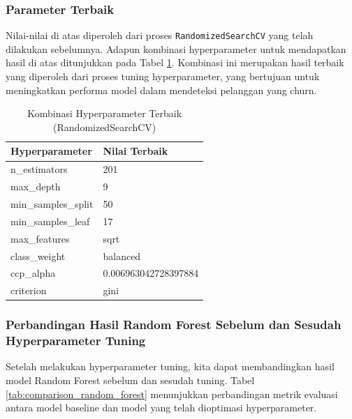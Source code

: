 \subsubsection{Parameter Terbaik}
Nilai-nilai di atas diperoleh dari proses \texttt{RandomizedSearchCV} yang telah dilakukan sebelumnya. Adapun kombinasi hyperparameter untuk mendapatkan hasil di atas ditunjukkan pada Tabel \ref{tab:best_params_random_forest}. Kombinasi ini merupakan hasil terbaik yang diperoleh dari proses tuning hyperparameter, yang bertujuan untuk meningkatkan performa model dalam mendeteksi pelanggan yang churn.


\begin{table}[H]
    \centering
    \caption{Kombinasi Hyperparameter Terbaik (RandomizedSearchCV)}
    \label{tab:best_params_random_forest}
    \begin{tabular}{|l|l|}
        \hline
        \textbf{Hyperparameter} & \textbf{Nilai Terbaik} \\ \hline
        n\_estimators & 201 \\ \hline
        max\_depth & 9 \\ \hline
        min\_samples\_split & 50 \\ \hline
        min\_samples\_leaf & 17 \\ \hline
        max\_features & sqrt \\ \hline
        class\_weight & balanced \\ \hline
        ccp\_alpha & 0.006963042728397884 \\ \hline
        criterion & gini \\ \hline
    \end{tabular}
\end{table}

\subsubsection{Perbandingan Hasil Random Forest Sebelum dan Sesudah Hyperparameter Tuning}
Setelah melakukan hyperparameter tuning, kita dapat membandingkan hasil model Random Forest sebelum dan sesudah tuning. Tabel \ref{tab:comparison_random_forest} menunjukkan perbandingan metrik evaluasi antara model baseline dan model yang telah dioptimasi hyperparameter.

